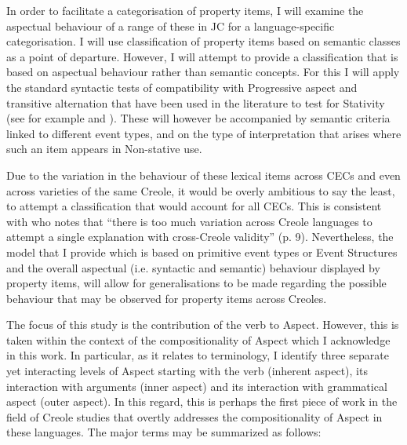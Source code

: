 In order to facilitate a categorisation of property items, I will examine the
aspectual behaviour of a range of these in JC for a language-specific
categorisation.  I will use  classification of property
items based on  semantic classes as a point of departure.
However, I will attempt to provide a classification that is based on aspectual
behaviour rather than semantic concepts.  For this I will apply the standard
syntactic tests of compatibility with Progressive aspect and transitive
alternation that have been used in the literature to test for Stativity (see for
example \citealt{Jaganauth1987} and \citealt{Winford1993}).  These will however be
accompanied by semantic criteria linked to different event types, and on the
type of interpretation that arises where such an item appears in Non-stative
use.

Due to the variation in the behaviour of these lexical items across CECs and
even across varieties of the same Creole, it would be overly ambitious to say
the least, to attempt a classification that would account for all CECs. This is
consistent with \citet{Kouwenberg1996} who notes that ``there is too much
variation across Creole languages to attempt a single explanation with
cross-Creole validity'' (p. 9).  Nevertheless, the model that I provide which is
based on primitive event types or Event Structures and the overall aspectual
(i.e. syntactic and semantic) behaviour displayed by property items, will allow
for generalisations to be made regarding the possible behaviour that may be
observed for property items across Creoles.

The focus of this study is the contribution of the verb to Aspect.  However,
this is taken within the context of the compositionality of Aspect which I
acknowledge in this work.  In particular, as it relates to terminology, I
identify three separate yet interacting levels of Aspect starting with the verb
(inherent aspect), its interaction with arguments (inner aspect) and its
interaction with grammatical aspect (outer aspect).  In this regard, this is
perhaps the first piece of work in the field of Creole studies that overtly
addresses the compositionality of Aspect in these languages.  The major terms
may be summarized as follows:

